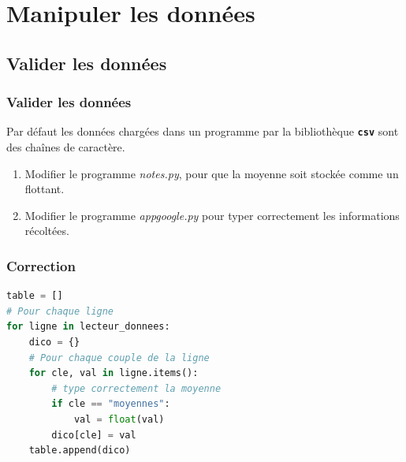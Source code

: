 \documentclass[svgnames,11pt]{beamer}
\begin{document}
\section{Manipuler les données}
\subsection{Valider les données}
\begin{frame}
    \frametitle{Valider les données}
    Par défaut les données chargées dans un programme par la bibliothèque \textbf{\texttt{csv}} sont des chaînes de caractère.
    \begin{activite}
        \begin{enumerate}
            \item Modifier le programme \emph{notes.py}, pour que la moyenne soit stockée comme un flottant.
            \item  Modifier le programme \emph{appgoogle.py} pour typer correctement les informations récoltées.
        \end{enumerate}
    \end{activite}
\end{frame}
\begin{frame}[fragile]
    \frametitle{Correction}

    \begin{center}
    \begin{lstlisting}[language=Python, basicstyle=\small]
table = []
# Pour chaque ligne
for ligne in lecteur_donnees:
    dico = {}
    # Pour chaque couple de la ligne
    for cle, val in ligne.items():
        # type correctement la moyenne
        if cle == "moyennes":
            val = float(val)
        dico[cle] = val
    table.append(dico)
    \end{lstlisting}
    \label{CODE}
    \end{center}
\end{frame}
\end{document}
